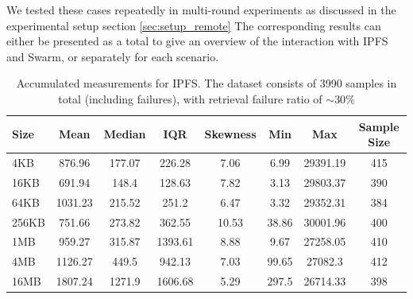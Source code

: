 
We tested these cases repeatedly in multi-round experiments as discussed in the experimental setup section \ref{sec:setup_remote}
The corresponding results can either be presented as a total to give an overview of the interaction with IPFS and Swarm, or separately for each scenario.


\begin{table}[H]
\centering
\begin{small}
\caption{Accumulated measurements for IPFS. The dataset consists of 3990 samples in total (including failures), with retrieval failure ratio of $\sim 30\%$ }
\label{tab:ipfs_all}
\begin{tabular}{@{}lccccccc@{}}
\toprule
Size & Mean & Median & IQR & Skewness & Min & Max & Sample Size \\ \midrule
4KB & 876.96 & 177.07 & 226.28 & 7.06 & 6.99 & 29391.19 & 415\\
16KB & 691.94 & 148.4 & 128.63 & 7.82 & 3.13 & 29803.37 & 390\\
64KB & 1031.23 & 215.52 & 251.2 & 6.47 & 3.32 & 29352.31 & 384\\
256KB & 751.66 & 273.82 & 362.55 & 10.53 & 38.86 & 30001.96 & 400\\
1MB & 959.27 & 315.87 & 1393.61 & 8.88 & 9.67 & 27258.05 & 410\\
4MB & 1126.27 & 449.5 & 942.13 & 7.03 & 99.65 & 27082.3 & 412\\
16MB & 1807.24 & 1271.9 & 1606.68 & 5.29 & 297.5 & 26714.33 & 398\\
\bottomrule
\end{tabular}
\end{small}
\end{table}

